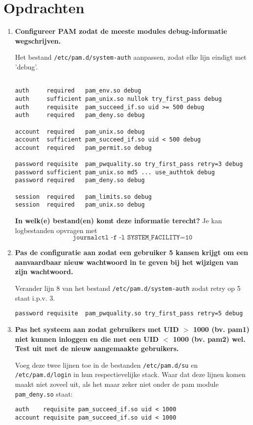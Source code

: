 \documentclass{report}
\begin{document}
\section{Opdrachten}
\begin{enumerate}
	\item \textbf{Configureer PAM zodat de meeste modules debug-informatie wegschrijven.}
	
	Het bestand \texttt{/etc/pam.d/system-auth} aanpassen, zodat elke lijn eindigt met 'debug'.
	\begin{lstlisting}

auth     required   pam_env.so debug
auth     sufficient pam_unix.so nullok try_first_pass debug
auth     requisite  pam_succeed_if.so uid >= 500 debug
auth     required   pam_deny.so debug
		
account  required   pam_unix.so debug
account  sufficient pam_succeed_if.so uid < 500 debug
account  required   pam_permit.so debug
		
password requisite  pam_pwquality.so try_first_pass retry=3 debug
password sufficient pam_unix.so md5 ... use_authtok debug
password required   pam_deny.so debug
		
session  required   pam_limits.so debug
session  required   pam_unix.so debug
	\end{lstlisting}
	\textbf{In welk(e) bestand(en) komt deze informatie terecht?}
	Je kan logbestanden opvragen met 
	$$\texttt{journalctl -f -l SYSTEM\_FACILITY=10}$$
	\item \textbf{Pas de configuratie aan zodat een gebruiker 5 kansen krijgt om een aanvaardbaar nieuw wachtwoord in te geven bij het wijzigen van zijn wachtwoord.}
	
	Verander lijn 8 van het bestand \texttt{/etc/pam.d/system-auth} zodat retry op 5 staat i.p.v. 3.
	\begin{lstlisting}
password requisite  pam_pwquality.so try_first_pass retry=5 debug
	\end{lstlisting}
	\item \textbf{Pas het systeem aan zodat gebruikers met UID $>$ 1000 (bv. pam1) niet kunnen inloggen en die met een UID $<$ 1000 (bv. pam2) wel. Test uit met de nieuw aangemaakte gebruikers.}

	Voeg deze twee lijnen toe in de bestanden \texttt{/etc/pam.d/su} en \texttt{/etc/pam.d/login} in hun respectievelijke stack. Waar dat deze lijnen komen maakt niet zoveel uit, als het maar zeker niet onder de pam module \texttt{pam\_deny.so} staat:
	\begin{lstlisting}
auth    requisite pam_succeed_if.so uid < 1000
account requisite pam_succeed_if.so uid < 1000
	\end{lstlisting}


\end{enumerate}
\end{document}
